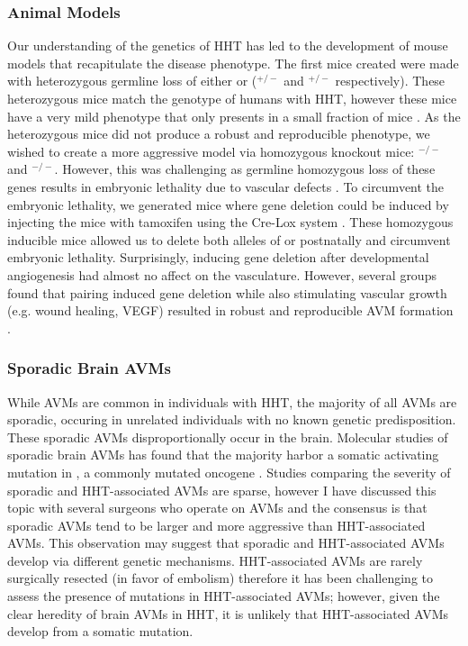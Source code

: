 \subsubsection{Animal Models}
Our understanding of the genetics of HHT has led to the development of mouse models that recapitulate the disease phenotype. The first mice created were made with heterozygous germline loss of either  or  ($^{+/-}$ and $^{+/-}$ respectively). These heterozygous mice match the genotype of humans with HHT, however these mice have a very mild phenotype that only presents in a small fraction of mice \citep{bourdeau1999, torsney2003, srinivasan2003}. As the heterozygous mice did not produce a robust and reproducible phenotype, we wished to create a more aggressive model via homozygous knockout mice: $^{-/-}$ and $^{-/-}$. However, this was challenging as germline homozygous loss of these genes results in embryonic lethality due to vascular defects \citep{li1999, bourdeau1999, oh2000, arthur2000}. To circumvent the embryonic lethality, we generated mice where gene deletion could be induced by injecting the mice with tamoxifen using the Cre-Lox system \citep{allinson2007, park2008}. These homozygous inducible mice allowed us to delete both alleles of  or  postnatally and circumvent embryonic lethality. Surprisingly, inducing gene deletion after developmental angiogenesis had almost no affect on the vasculature. However, several groups found that pairing induced gene deletion while also stimulating vascular growth (e.g. wound healing, VEGF) resulted in robust and reproducible AVM formation \citep{park2008, walker2011, choi2012, chen2013}.

\subsubsection{Sporadic Brain AVMs}
While AVMs are common in individuals with HHT, the majority of all AVMs are sporadic, occuring in unrelated individuals with no known genetic predisposition. These sporadic AVMs disproportionally occur in the brain. Molecular studies of sporadic brain AVMs has found that the majority harbor a somatic activating mutation in , a commonly mutated oncogene \citep{nikolaev2018}. Studies comparing the severity of sporadic and HHT-associated AVMs are sparse, however I have discussed this topic with several surgeons who operate on AVMs and the consensus is that sporadic AVMs tend to be larger and more aggressive than HHT-associated AVMs. This observation may suggest that sporadic and HHT-associated AVMs develop via different genetic mechanisms. HHT-associated AVMs are rarely surgically resected (in favor of embolism) therefore it has been challenging to assess the presence of  mutations in HHT-associated AVMs; however, given the clear heredity of brain AVMs in HHT, it is unlikely that HHT-associated AVMs develop from a somatic  mutation. 



